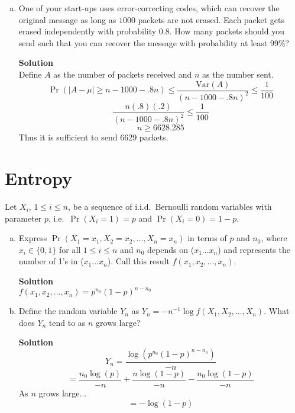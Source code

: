 \documentclass[11pt]{article}
\newcommand*{\Question}[1]{\section{#1}}
\newenvironment{Answer}{\vspace{10pt}\begin{mdframed}\textbf{Solution}\\}{\end{mdframed}\vfill\pagebreak[3]}
\newenvironment{Answer}{\vspace{10pt}}{\vfill\pagebreak[3]}
\newcommand*{\Var}[1]{\text{Var}(#1)}
\begin{document}
\begin{enumerate}[(a)]
  \item One of your start-ups uses error-correcting codes, which can recover the original message as long as $1000$ packets are not erased. Each packet gets erased independently with probability $0.8$. How many packets should you send such that you can recover the message with probability at least 99\%?
  \begin{Answer}
  Define $A$ as the number of packets received and $n$ as the number sent. 
    $$\Pr(|A-\mu|\geq n-1000-.8n)\leq \frac{\Var{A}}{(n-1000-.8n)^2}\leq \frac{1}{100}$$
    $$\frac{n(.8)(.2)}{(n-1000-.8n)^2}\leq \frac{1}{100}$$
    $$n \geq 6628.285$$
    Thus it is sufficient to send 6629 packets.
  \end{Answer}
\end{enumerate}



\Question{Entropy}
Let $X_i$, $1 \leq i \leq n$, be a sequence of i.i.d.\ Bernoulli random variables with parameter $p$, i.e.\ $\Pr(X_i = 1) = p$ and $\Pr(X_i = 0) = 1-p$.
\begin{enumerate}[(a)]
  \item Express $\Pr(X_1 = x_1, X_2 = x_2, \dots, X_n = x_n)$ in terms of $p$ and $n_0$, where $x_i \in \{0,1 \}$ for all $1 \leq i \leq n$ and $n_0$ depends on ($x_1 \dots x_n$) and represents the number of 1's in ($x_1 \dots x_n$). Call this result $f(x_1, x_2, \dots, x_n)$.
  \begin{Answer}
    $f(x_1,x_2,...,x_n)=p^{n_0}(1-p)^{n-n_0}$
  \end{Answer}

  \item Define the random variable $Y_n$ as $Y_n = - n^{-1} \log f(X_1,X_2,\dots,X_n)$. What does $Y_n$ tend to as $n$ grows large?
  \begin{Answer}
$$Y_n=\frac{\log(p^{n_0}(1-p)^{n-n_0})}{-n}$$
$$=\frac{n_0\log(p)}{-n}+\frac{n\log(1-p)}{-n}-\frac{n_0\log(1-p)}{-n}$$
As $n$ grows large...
$$=-\log(1-p)$$
  \end{Answer}
\end{enumerate}
\end{document}
